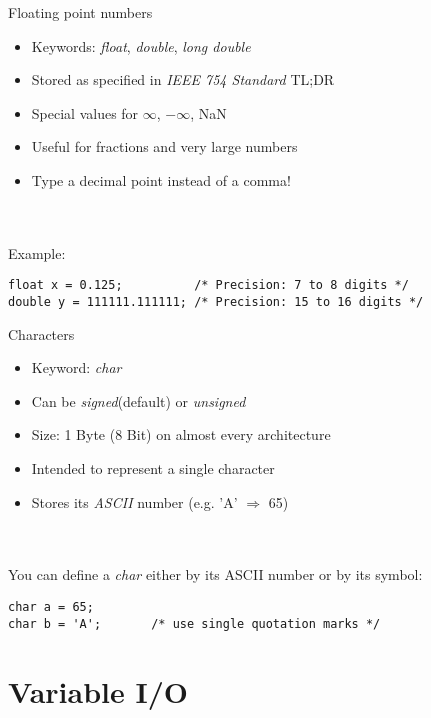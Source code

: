 \begin{frame}[fragile]{Floating point numbers}
	\begin{itemize}
		\item Keywords: \textit{float}, \textit{double}, \textit{long double}
		\item Stored as specified in \textit{IEEE 754 Standard} TL;DR
		\item Special values for $\infty$, $-\infty$, NaN
		\item Useful for fractions and very large numbers
		\item Type a decimal point instead of a comma!
	\end{itemize}\ \\
	\ \\
	Example:
	\begin{lstlisting}[numbers=none]
float x = 0.125;          /* Precision: 7 to 8 digits */
double y = 111111.111111; /* Precision: 15 to 16 digits */
\end{lstlisting}
\end{frame}
\begin{frame}[fragile]{Characters}
	\begin{itemize}
		\item Keyword: \textit{char}
		\item Can be \textit{signed}(default) or \textit{unsigned}	
		\item Size: 1 Byte (8 Bit) on almost every architecture
		\item Intended to represent a single character
		\item Stores its \textit{ASCII} number (e.g. 'A' $\Rightarrow$ 65)
	\end{itemize}\ \\
	\ \\
	You can define a \textit{char} either by its ASCII number or by its symbol:
	\begin{lstlisting}[numbers=none]
char a = 65;
char b = 'A';       /* use single quotation marks */
\end{lstlisting}
\end{frame}

\section{Variable I/O}
